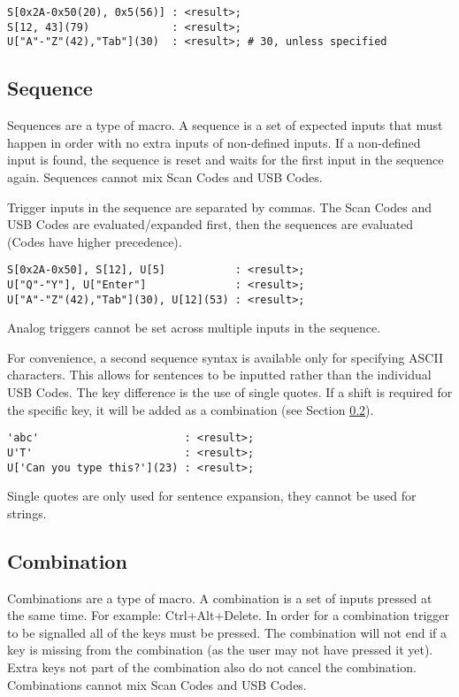 \documentclass{kiibohd-template}
\begin{document}
\begin{lstlisting}
S[0x2A-0x50(20), 0x5(56)] : <result>;
S[12, 43](79)             : <result>;
U["A"-"Z"(42),"Tab"](30)  : <result>; # 30, unless specified
\end{lstlisting}


\subsection{Sequence}
\label{subsec:Sequence}

Sequences are a type of macro.
A sequence is a set of expected inputs that must happen in order with no extra inputs of non-defined inputs.
If a non-defined input is found, the sequence is reset and waits for the first input in the sequence again.
Sequences cannot mix Scan Codes and USB Codes.

Trigger inputs in the sequence are separated by commas.
The Scan Codes and USB Codes are evaluated/expanded first, then the sequences are evaluated (Codes have higher precedence).

\begin{lstlisting}
S[0x2A-0x50], S[12], U[5]           : <result>;
U["Q"-"Y"], U["Enter"]              : <result>;
U["A"-"Z"(42),"Tab"](30), U[12](53) : <result>;
\end{lstlisting}

Analog triggers cannot be set across multiple inputs in the sequence.

For convenience, a second sequence syntax is available only for specifying ASCII characters.
This allows for sentences to be inputted rather than the individual USB Codes.
The key difference is the use of single quotes.
If a shift is required for the specific key, it will be added as a combination (see Section \ref{subsec:Combination}).

\begin{lstlisting}
'abc'                       : <result>;
U'T'                        : <result>;
U['Can you type this?'](23) : <result>;
\end{lstlisting}

Single quotes are only used for sentence expansion, they cannot be used for strings.


\subsection{Combination}
\label{subsec:Combination}

Combinations are a type of macro.
A combination is a set of inputs pressed at the same time.
For example: Ctrl+Alt+Delete.
In order for a combination trigger to be signalled all of the keys must be pressed.
The combination will not end if a key is missing from the combination (as the user may not have pressed it yet).
Extra keys not part of the combination also do not cancel the combination.
Combinations cannot mix Scan Codes and USB Codes.
\end{document}
